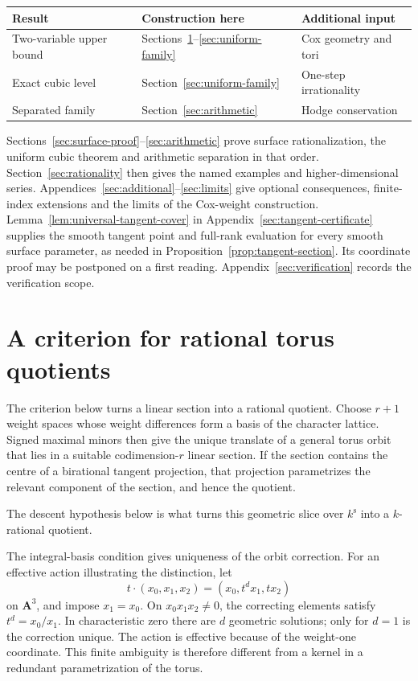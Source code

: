 \documentclass[11pt]{article}
\theoremstyle{remark}
\newcommand{\A}{\mathbf A}
\newcommand{\ks}{k^{\mathrm s}}
\begin{document}
\begin{center}
\begin{tabular}{@{}lll@{}}
\toprule
Result & Construction here & Additional input\\
\midrule
Two-variable upper bound & Sections~\ref{sec:quotient}--\ref{sec:uniform-family}
 & Cox geometry and tori\\
Exact cubic level & Section~\ref{sec:uniform-family} & One-step irrationality\\
Separated family & Section~\ref{sec:arithmetic} & Hodge conservation\\
\bottomrule
\end{tabular}
\end{center}
Sections~\ref{sec:surface-proof}--\ref{sec:arithmetic} prove surface
rationalization, the uniform cubic theorem and arithmetic separation in that
order. Section~\ref{sec:rationality} then gives the named examples and
higher-dimensional series.
Appendices~\ref{sec:additional}--\ref{sec:limits} give optional consequences,
finite-index extensions and the limits of the Cox-weight construction.
Lemma~\ref{lem:universal-tangent-cover} in
Appendix~\ref{sec:tangent-certificate} supplies the smooth tangent point and
full-rank evaluation for every smooth surface parameter, as needed in
Proposition~\ref{prop:tangent-section}. Its coordinate proof may be postponed
on a first reading. Appendix~\ref{sec:verification}
records the verification scope.

\section{A criterion for rational torus quotients}\label{sec:quotient}

The criterion below turns a linear section into a rational quotient.  Choose
\(r+1\) weight spaces whose weight differences form a basis of the character
lattice.  Signed maximal minors then give the unique translate of a general
torus orbit that lies in a suitable codimension-\(r\) linear section.  If the
section contains the centre of a birational tangent projection, that
projection parametrizes the relevant component of the section, and hence the
quotient.

The descent hypothesis below is what turns this geometric slice over \(\ks\)
into a \(k\)-rational quotient.

The integral-basis condition gives uniqueness of the orbit correction.
For an effective action illustrating the distinction, let
\[
 t\cdot(x_0,x_1,x_2)=(x_0,t^d x_1,tx_2)
\]
on \(\A^3\), and impose \(x_1=x_0\).  On \(x_0x_1x_2\ne0\),
the correcting elements satisfy \(t^d=x_0/x_1\).  In characteristic zero
there are \(d\) geometric solutions; only for \(d=1\) is the correction
unique.  The action is effective because of the weight-one coordinate.
This finite ambiguity is therefore different from a kernel in a redundant
parametrization of the torus.
\end{document}
